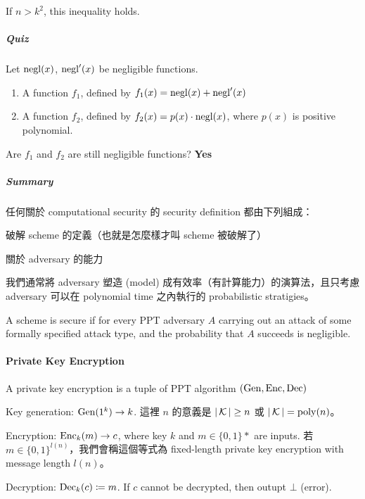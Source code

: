If \(n > k^2\), this inequality holds.

\subparagraph{Quiz}

Let \(\operatorname{negl}(x)\), \(\operatorname{negl}'(x)\) be negligible functions. \\
\begin{enumerate}
	\item A function \(f_1\), defined by \(f_1(x) = \operatorname{negl}(x) + \operatorname{negl}'(x)\)
	\item A function \(f_2\), defined by \(f_2(x) = p(x) \cdot \operatorname{negl}(x)\), where \(p(x)\) is positive polynomial.
\end{enumerate}

Are \(f_1\) and \(f_2\) are still negligible functions? \textbf{Yes}

\subparagraph{Summary}

任何關於 computational security 的 security definition 都由下列組成：
\begin{myEnumerate}
	\item 破解 scheme 的定義（也就是怎麼樣才叫 scheme 被破解了）
	\item 關於 adversary 的能力
\end{myEnumerate}

我們通常將 adversary 塑造 (model) 成有效率（有計算能力）的演算法，且只考慮 adversary 可以在 polynomial time 之內執行的 probabilistic stratigies。

\begin{definition}
	A scheme is secure if for every PPT adversary \(A\) carrying out an attack of some formally specified attack type, and the probability that \(A\) succeeds is negligible.
\end{definition}


\paragraph{Private Key Encryption}

\begin{definition}
	A private key encryption is a tuple of PPT algorithm \((\operatorname{Gen}, \operatorname{Enc}, \operatorname{Dec})\) \\
	\begin{myItemize}
		\item Key generation: \(\operatorname{Gen}(1^k) \rightarrow k\). 這裡 \(n\) 的意義是 \(|\operatorname{\mathcal{K}}| \geq n\) 或 \(|\operatorname{\mathcal{K}}| = \mathrm{poly}(n)\)。
		
		\item Encryption: \(\operatorname{Enc}_k(m) \rightarrow c\), where key \(k\) and \(m \in \{0, 1\}*\) are inputs. 若 \(m \in \{0, 1\}^{l(n)}\)，我們會稱這個等式為 fixed-length private key encryption with message length \(l(n)\)。
		
		\item Decryption: \(\operatorname{Dec}_k(c) \coloneq m\). If \(c\) cannot be decrypted, then outupt \(\bot\) (error). 
	\end{myItemize}
\end{definition}


